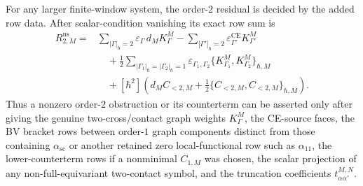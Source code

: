 \begin{prop}
  For any larger finite-window system, the order-\(2\) residual is
  decided by the added row data.  After scalar-condition vanishing its
  exact row sum is
  \[
  \begin{aligned}
    R^{\mathrm{ns}}_{2,M}
     ={}&
      \sum_{|\Gamma|_\hbar=2}
        \varepsilon_\Gamma\,d_M K^M_\Gamma
      -\sum_{|\Gamma'|_\hbar=2}
        \varepsilon^{\mathrm{CE}}_{\Gamma'}K^M_{\Gamma'}\\
      &\quad
      +\frac12
      \sum_{|\Gamma_1|_\hbar=|\Gamma_2|_\hbar=1}
        \varepsilon_{\Gamma_1,\Gamma_2}
        \{K^M_{\Gamma_1},K^M_{\Gamma_2}\}_{\hbar,M}\\
      &\quad
      +[\hbar^2]\left(
        d_M C_{<2,M}
        +\frac12\{C_{<2,M},C_{<2,M}\}_{\hbar,M}\right).
  \end{aligned}
  \]
  Thus a nonzero order-\(2\) obstruction or its counterterm can be asserted
  only after giving the genuine two-cross/contact graph weights
  \(K^M_\Gamma\), the CE-source faces, the BV bracket rows between
  order-\(1\) graph components distinct from those containing
  \(\alpha_{\mathrm{sc}}\) or another retained zero local-functional row
  such as \(\alpha_{11}\), the
  lower-counterterm rows if a nonminimal \(C_{1,M}\) was chosen, the scalar
  projection of any non-full-equivariant two-contact symbol, and the
  truncation coefficients \(t^{M,N}_{\alpha\alpha'}\).
\end{prop}

